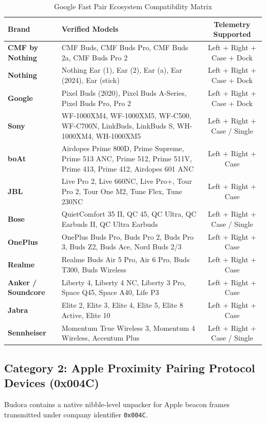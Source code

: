 \documentclass[11pt,a4paper]{article}
\begin{document}
\begin{table}[h!]
\centering
\small
\begin{tabularx}{\linewidth}{l p{7.5cm} c}
\toprule
\textbf{Brand} & \textbf{Verified Models} & \textbf{Telemetry Supported} \\
\midrule
\textbf{CMF by Nothing} & CMF Buds, CMF Buds Pro, CMF Buds 2a, CMF Buds Pro 2 & Left + Right + Case + Dock \\
\textbf{Nothing} & Nothing Ear (1), Ear (2), Ear (a), Ear (2024), Ear (stick) & Left + Right + Case + Dock \\
\textbf{Google} & Pixel Buds (2020), Pixel Buds A-Series, Pixel Buds Pro, Pro 2 & Left + Right + Case + Dock \\
\textbf{Sony} & WF-1000XM4, WF-1000XM5, WF-C500, WF-C700N, LinkBuds, LinkBuds S, WH-1000XM4, WH-1000XM5 & Left + Right + Case / Single \\
\textbf{boAt} & Airdopes Prime 800D, Prime Supreme, Prime 513 ANC, Prime 512, Prime 511V, Prime 413, Prime 412, Airdopes 601 ANC & Left + Right + Case \\
\textbf{JBL} & Live Pro 2, Live 660NC, Live Pro+, Tour Pro 2, Tour One M2, Tune Flex, Tune 230NC & Left + Right + Case \\
\textbf{Bose} & QuietComfort 35 II, QC 45, QC Ultra, QC Earbuds II, QC Ultra Earbuds & Left + Right + Case / Single \\
\textbf{OnePlus} & OnePlus Buds Pro, Buds Pro 2, Buds Pro 3, Buds Z2, Buds Ace, Nord Buds 2/3 & Left + Right + Case \\
\textbf{Realme} & Realme Buds Air 5 Pro, Air 6 Pro, Buds T300, Buds Wireless & Left + Right + Case \\
\textbf{Anker / Soundcore} & Liberty 4, Liberty 4 NC, Liberty 3 Pro, Space Q45, Space A40, Life P3 & Left + Right + Case \\
\textbf{Jabra} & Elite 2, Elite 3, Elite 4, Elite 5, Elite 8 Active, Elite 10 & Left + Right + Case \\
\textbf{Sennheiser} & Momentum True Wireless 3, Momentum 4 Wireless, Accentum Plus & Left + Right + Case / Single \\
\bottomrule
\end{tabularx}
\caption{Google Fast Pair Ecosystem Compatibility Matrix}
\end{table}

\subsection{Category 2: Apple Proximity Pairing Protocol Devices (0x004C)}
Budora contains a native nibble-level unpacker for Apple beacon frames transmitted under company identifier \texttt{0x004C}.
\end{document}
